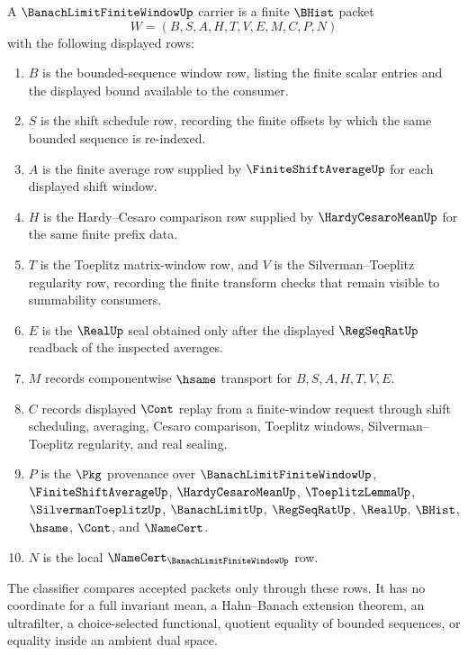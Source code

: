 \begin{definition}
\label{def:banach-limit-finite-window-carrier}
A $\BanachLimitFiniteWindowUp$ carrier is a finite $\BHist$ packet
$$
W=(B,S,A,H,T,V,E,M,C,P,N)
$$
with the following displayed rows:
\begin{enumerate}
\item $B$ is the bounded-sequence window row, listing the finite scalar entries and the displayed bound available to the consumer.
\item $S$ is the shift schedule row, recording the finite offsets by which the same bounded sequence is re-indexed.
\item $A$ is the finite average row supplied by $\FiniteShiftAverageUp$ for each displayed shift window.
\item $H$ is the Hardy--Cesaro comparison row supplied by $\HardyCesaroMeanUp$ for the same finite prefix data.
\item $T$ is the Toeplitz matrix-window row, and $V$ is the Silverman--Toeplitz regularity row, recording the finite transform checks that remain visible to summability consumers.
\item $E$ is the $\RealUp$ seal obtained only after the displayed $\RegSeqRatUp$ readback of the inspected averages.
\item $M$ records componentwise $\hsame$ transport for $B,S,A,H,T,V,E$.
\item $C$ records displayed $\Cont$ replay from a finite-window request through shift scheduling, averaging, Cesaro comparison, Toeplitz windows, Silverman--Toeplitz regularity, and real sealing.
\item $P$ is the $\Pkg$ provenance over $\BanachLimitFiniteWindowUp$, $\FiniteShiftAverageUp$, $\HardyCesaroMeanUp$, $\ToeplitzLemmaUp$, $\SilvermanToeplitzUp$, $\BanachLimitUp$, $\RegSeqRatUp$, $\RealUp$, $\BHist$, $\hsame$, $\Cont$, and $\NameCert$.
\item $N$ is the local $\NameCert_{\BanachLimitFiniteWindowUp}$ row.
\end{enumerate}
The classifier compares accepted packets only through these rows. It has no coordinate for a full invariant mean, a Hahn--Banach extension theorem, an ultrafilter, a choice-selected functional, quotient equality of bounded sequences, or equality inside an ambient dual space.
\end{definition}

